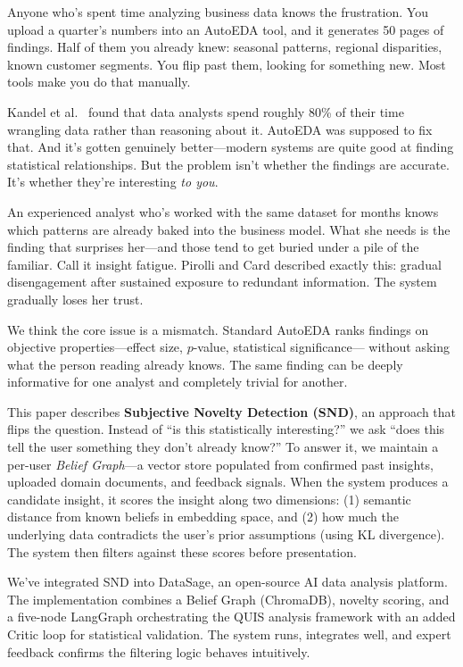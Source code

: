 \documentclass[conference]{IEEEtran}
\begin{document}
Anyone who's spent time analyzing business data knows the frustration.
You upload a quarter's numbers into an AutoEDA tool, and it generates
50 pages of findings. Half of them you already knew: seasonal patterns,
regional disparities, known customer segments. You flip past them,
looking for something new. Most tools make you do that manually.

Kandel et al.\ \cite{kandel2012enterprise} found that data analysts spend
roughly 80\% of their time wrangling data rather than reasoning about it.
AutoEDA was supposed to fix that. And it's gotten genuinely better---modern
systems are quite good at finding statistical relationships. But the
problem isn't whether the findings are accurate. It's whether they're
interesting \textit{to you}.

An experienced analyst who's worked with the same dataset for months knows
which patterns are already baked into the business model. What she needs is
the finding that surprises her---and those tend to get buried under a pile
of the familiar. Call it insight fatigue. Pirolli and Card \cite{pirolli2005sensemaking}
described exactly this: gradual disengagement after sustained exposure to
redundant information. The system gradually loses her trust.

We think the core issue is a mismatch. Standard AutoEDA ranks findings on
objective properties---effect size, $p$-value, statistical significance---
without asking what the person reading already knows. The same finding can
be deeply informative for one analyst and completely trivial for another.

This paper describes \textbf{Subjective Novelty Detection (SND)}, an approach
that flips the question. Instead of ``is this statistically interesting?''
we ask ``does this tell the user something they don't already know?'' To
answer it, we maintain a per-user \emph{Belief Graph}---a vector store
populated from confirmed past insights, uploaded domain documents, and
feedback signals. When the system produces a candidate insight, it scores
the insight along two dimensions: (1) semantic distance from known beliefs
in embedding space, and (2) how much the underlying data contradicts the
user's prior assumptions (using KL divergence). The system then filters
against these scores before presentation.

We've integrated SND into DataSage, an open-source AI data analysis platform.
The implementation combines a Belief Graph (ChromaDB), novelty scoring, and a
five-node LangGraph orchestrating the QUIS analysis framework with an added
Critic loop for statistical validation. The system runs, integrates well, and
expert feedback confirms the filtering logic behaves intuitively.
\end{document}
